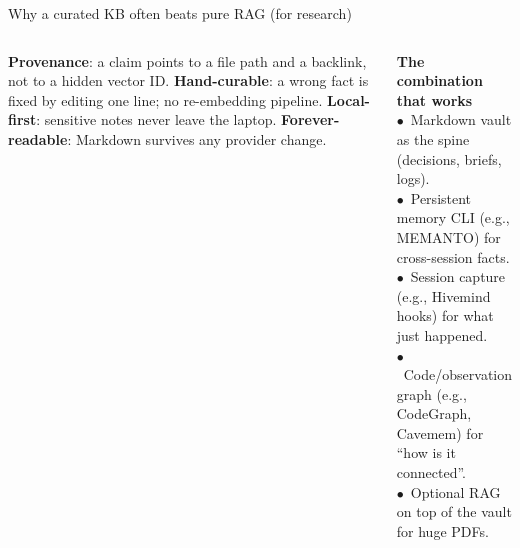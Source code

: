 \begin{frame}{Why a curated KB often beats pure RAG (for research)}
  \begin{columns}[T,onlytextwidth]
      \fourbullets%
        {\textbf{Provenance}: a claim points to a file path and a backlink, not to a hidden vector ID.}%
        {\textbf{Hand-curable}: a wrong fact is fixed by editing one line; no re-embedding pipeline.}%
        {\textbf{Local-first}: sensitive notes never leave the laptop.}%
        {\textbf{Forever-readable}: Markdown survives any provider change.}
      \begin{tcolorbox}[colback=softblue,colframe=deepblue,arc=2pt,boxrule=0.5pt]
        \small \textbf{The combination that works}\\[0.15cm]
        \scriptsize
        $\bullet$\ Markdown vault as the spine (decisions, briefs, logs).\\
        $\bullet$\ Persistent memory CLI (e.g., MEMANTO) for cross-session facts.\\
        $\bullet$\ Session capture (e.g., Hivemind hooks) for what just happened.\\
        $\bullet$\ Code/observation graph (e.g., CodeGraph, Cavemem) for ``how is it connected''.\\
        $\bullet$\ Optional RAG on top of the vault for huge PDFs.
      \end{tcolorbox}
  \end{columns}
  \vspace{0.3cm}
\end{frame}

